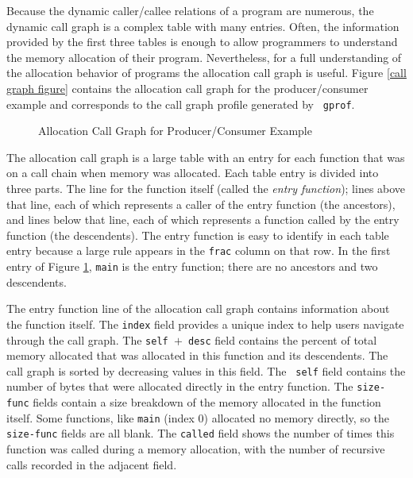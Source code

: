 Because the dynamic caller/callee relations of a program are numerous,
the dynamic call graph is a complex table with many entries.  Often,
the information provided by the first three tables is enough to allow
programmers to understand the memory allocation of their program.
Nevertheless, for a full understanding of the allocation behavior of
programs the allocation call graph is useful.  Figure \ref{call graph
figure} contains the allocation call graph for the producer/consumer
example and corresponds to the call graph profile generated by {\tt
gprof}. 	

\begin{figure}[ht]
\begin{singlespace}
{\scriptsize

}
\end{singlespace}

\caption{Allocation Call Graph for Producer/Consumer Example}
\label{call graph figure}
\end{figure}

The allocation call graph is a large table with an entry for each
function that was on a call chain when memory was allocated.  Each
table entry is divided into three parts.  The line for the function
itself (called the {\em entry function\/}); lines above that line,
each of which represents a caller of the entry function (the
ancestors), and lines below that line, each of which represents a
function called by the entry function (the descendents).  The entry
function is easy to identify in each table entry because a large rule
appears in the {\tt frac} column on that row.  In the first entry of
Figure \ref{call graph figure}, {\tt main} is the entry function;
there are no ancestors and two descendents.

The entry function line of the allocation call graph contains
information about the function itself.  The {\tt index} field provides
a unique index to help users navigate through the call graph.  The
{\tt self~$+$~desc} field contains the percent of total memory
allocated that was allocated in this function and its descendents.
The call graph is sorted by decreasing values in this field.  The {\tt
self} field contains the number of bytes that were allocated directly
in the entry function.  The {\tt size-func} fields contain a size
breakdown of the memory allocated in the function itself.  Some
functions, like {\tt main} (index 0) allocated no memory directly, so
the {\tt size-func} fields are all blank.  The {\tt called} field
shows the number of times this function was called during a memory
allocation, with the number of recursive calls recorded in the
adjacent field.

